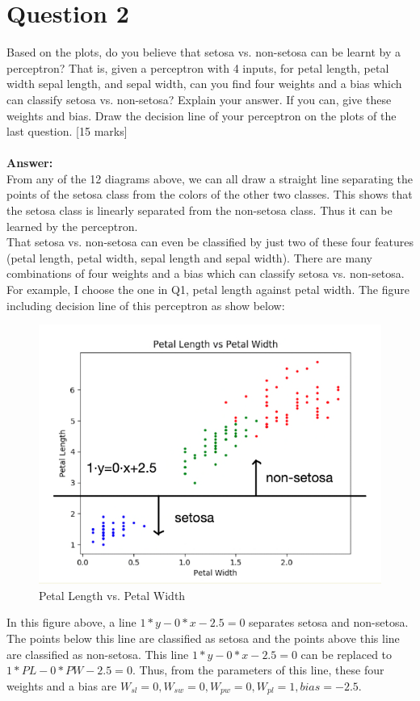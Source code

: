 \documentclass{article}
\begin{document}
\section{Question 2}
Based on the plots, do you believe that setosa vs. non-setosa can be learnt by a perceptron? That is, given a perceptron with 4 inputs, for petal length, petal width sepal length, and sepal width, can you find four weights and a bias which can classify setosa vs. non-setosa? Explain your answer. If you can, give these weights and bias. Draw the decision line of your perceptron on the plots of the last question.
[15 marks]\\\\
\textbf{Answer:}\\
From any of the 12 diagrams above, we can all draw a straight line separating the points of the setosa class from the colors of the other two classes. This shows that the setosa class is linearly separated from the non-setosa class. Thus it can be learned by the perceptron.\\
That setosa vs. non-setosa can even be classified by just two of these four features (petal length, petal width, sepal length and sepal width). There are many combinations of four weights and a bias which can classify setosa vs. non-setosa. For example, I choose the one in Q1, petal length against petal width. The figure including decision line of this perceptron as show below:\\
\begin{figure}[H]
\centering
\includegraphics[scale=0.4]{PLvsPW.png}
\caption{Petal Length vs. Petal Width}
\end{figure}
\noindent
In this figure above, a line $1*y-0*x-2.5=0$ separates setosa and non-setosa. The points below this line are classified as setosa and the points above this line are classified as non-setosa. This line $1*y-0*x-2.5=0$ can be replaced to $1*PL-0*PW-2.5=0$. Thus, from the parameters of this line, these four weights and a bias are $W_{sl}=0, W_{sw}=0, W_{pw}=0, W_{pl}=1, bias=-2.5$.
\end{document}
